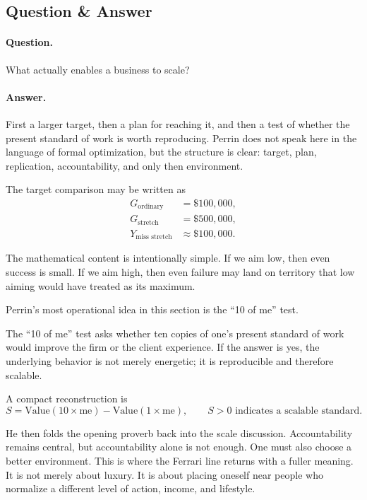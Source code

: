 \subsection{Question \& Answer}

\paragraph{Question.} What actually enables a business to scale?

\paragraph{Answer.} First a larger target, then a plan for reaching it, and then a test of whether the present standard of work is worth reproducing. Perrin does not speak here in the language of formal optimization, but the structure is clear: target, plan, replication, accountability, and only then environment.

The target comparison may be written as
\begin{align}
G_{\text{ordinary}} &= \$100{,}000,\\
G_{\text{stretch}} &= \$500{,}000,\\
Y_{\text{miss stretch}} &\approx \$100{,}000.
\end{align}

The mathematical content is intentionally simple. If we aim low, then even success is small. If we aim high, then even failure may land on territory that low aiming would have treated as its maximum.

Perrin's most operational idea in this section is the ``10 of me'' test.

\begin{definition}
The ``10 of me'' test asks whether ten copies of one's present standard of work would improve the firm or the client experience. If the answer is yes, the underlying behavior is not merely energetic; it is reproducible and therefore scalable.
\end{definition}

A compact reconstruction is
\begin{equation}
S = \text{Value}(10\times \text{me}) - \text{Value}(1\times \text{me}),
\qquad
S>0 \text{ indicates a scalable standard.}
\end{equation}

He then folds the opening proverb back into the scale discussion. Accountability remains central, but accountability alone is not enough. One must also choose a better environment. This is where the Ferrari line returns with a fuller meaning. It is not merely about luxury. It is about placing oneself near people who normalize a different level of action, income, and lifestyle.

